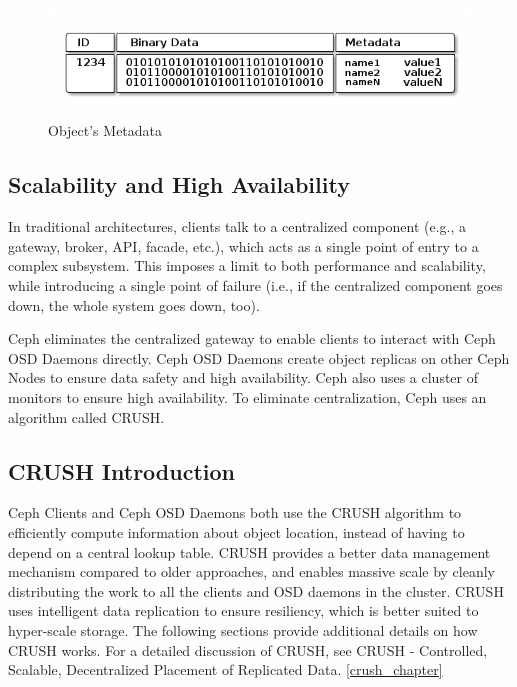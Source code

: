 \documentclass[12pt,a4paper]{report}
\begin{document}
\begin{figure}[h]
	\includegraphics[scale=0.60]{object_metadata.png}
	\caption{Object's Metadata}
	\label{fig:object_metadata}
\end{figure}

\subsection{Scalability and High Availability} \label{scal_and_high_avail}

In traditional architectures, clients talk to a centralized component (e.g., a
gateway, broker, API, facade, etc.), which acts as a single point of entry to a
complex subsystem. This imposes a limit to both performance and scalability,
while introducing a single point of failure (i.e., if the centralized component
goes down, the whole system goes down, too).

Ceph eliminates the centralized gateway to enable clients to interact with Ceph
OSD Daemons directly. Ceph OSD Daemons create object replicas on other Ceph
Nodes to ensure data safety and high availability. Ceph also uses a cluster of
monitors to ensure high availability. To eliminate centralization, Ceph uses an
algorithm called CRUSH.

\subsection{CRUSH Introduction}

Ceph Clients and Ceph OSD Daemons both use the CRUSH algorithm to efficiently
compute information about object location, instead of having to depend on a
central lookup table. CRUSH provides a better data management mechanism
compared to older approaches, and enables massive scale by cleanly distributing
the work to all the clients and OSD daemons in the cluster. CRUSH uses
intelligent data replication to ensure resiliency, which is better suited to
hyper-scale storage. The following sections provide additional details on how
CRUSH works. For a detailed discussion of CRUSH, see CRUSH - Controlled,
Scalable, Decentralized Placement of Replicated Data. \ref{crush_chapter}
\end{document}
